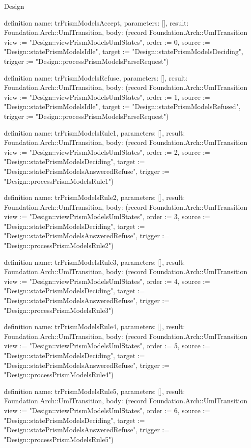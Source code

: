 \begin{lexlean}{Design}
\begin{semanticmodule}
definition{
  name: trPrismModelsAccept,
  parameters: [],
  result: Foundation.Arch::UmlTransition,
  body: (record Foundation.Arch::UmlTransition {view := "Design::viewPrismModelsUmlStates", order := 0, source := "Design::statePrismModelsIdle", target := "Design::statePrismModelsDeciding", trigger := "Design::processPrismModelsParseRequest"})
}

definition{
  name: trPrismModelsRefuse,
  parameters: [],
  result: Foundation.Arch::UmlTransition,
  body: (record Foundation.Arch::UmlTransition {view := "Design::viewPrismModelsUmlStates", order := 1, source := "Design::statePrismModelsIdle", target := "Design::statePrismModelsRefused", trigger := "Design::processPrismModelsParseRequest"})
}

definition{
  name: trPrismModelsRule1,
  parameters: [],
  result: Foundation.Arch::UmlTransition,
  body: (record Foundation.Arch::UmlTransition {view := "Design::viewPrismModelsUmlStates", order := 2, source := "Design::statePrismModelsDeciding", target := "Design::statePrismModelsAnsweredRefuse", trigger := "Design::processPrismModelsRule1"})
}

definition{
  name: trPrismModelsRule2,
  parameters: [],
  result: Foundation.Arch::UmlTransition,
  body: (record Foundation.Arch::UmlTransition {view := "Design::viewPrismModelsUmlStates", order := 3, source := "Design::statePrismModelsDeciding", target := "Design::statePrismModelsAnsweredRefuse", trigger := "Design::processPrismModelsRule2"})
}

definition{
  name: trPrismModelsRule3,
  parameters: [],
  result: Foundation.Arch::UmlTransition,
  body: (record Foundation.Arch::UmlTransition {view := "Design::viewPrismModelsUmlStates", order := 4, source := "Design::statePrismModelsDeciding", target := "Design::statePrismModelsAnsweredRefuse", trigger := "Design::processPrismModelsRule3"})
}

definition{
  name: trPrismModelsRule4,
  parameters: [],
  result: Foundation.Arch::UmlTransition,
  body: (record Foundation.Arch::UmlTransition {view := "Design::viewPrismModelsUmlStates", order := 5, source := "Design::statePrismModelsDeciding", target := "Design::statePrismModelsAnsweredRefuse", trigger := "Design::processPrismModelsRule4"})
}

definition{
  name: trPrismModelsRule5,
  parameters: [],
  result: Foundation.Arch::UmlTransition,
  body: (record Foundation.Arch::UmlTransition {view := "Design::viewPrismModelsUmlStates", order := 6, source := "Design::statePrismModelsDeciding", target := "Design::statePrismModelsAnsweredRefuse", trigger := "Design::processPrismModelsRule5"})
}


\end{semanticmodule}
\end{lexlean}
